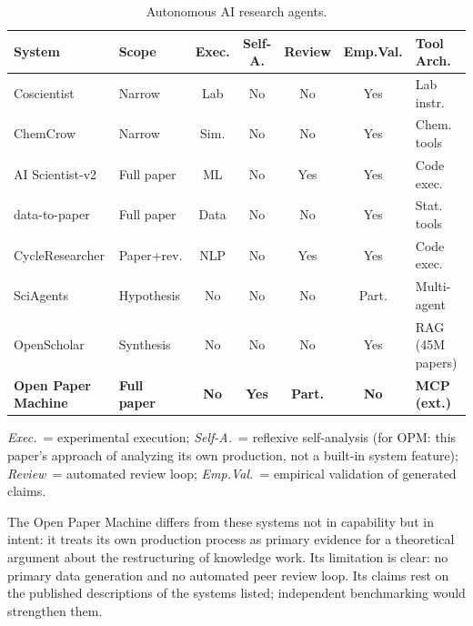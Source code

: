 \documentclass{article}
\begin{document}
\begin{table}[ht]
\centering
\small
\caption{Autonomous AI research agents.}
\label{tab:systems}
\begin{tabularx}{\textwidth}{@{} >{\raggedright\arraybackslash}X l c c c c >{\raggedright\arraybackslash}p{2.2cm} @{}}
\toprule
\textbf{System} & \textbf{Scope} & \textbf{Exec.} & \textbf{Self-A.} & \textbf{Review} & \textbf{Emp.Val.} & \textbf{Tool Arch.} \\
\midrule
Coscientist \citep{boiko2023autonomous} & Narrow & Lab & No & No & Yes & Lab instr. \\
ChemCrow \citep{bran2024chemistry} & Narrow & Sim. & No & No & Yes & Chem. tools \\
AI Scientist-v2 \citep{yamada2025scientist} & Full paper & ML & No & Yes & Yes & Code exec. \\
data-to-paper \citep{ifargan2024autonomous} & Full paper & Data & No & No & Yes & Stat. tools \\
CycleResearcher \citep{weng2024cycleresearcher} & Paper+rev. & NLP & No & Yes & Yes & Code exec. \\
SciAgents \citep{ghafarollahi2024sciagents} & Hypothesis & No & No & No & Part. & Multi-agent \\
OpenScholar \citep{asai2024openscholar} & Synthesis & No & No & No & Yes & RAG (45M papers) \\
\textbf{Open Paper Machine} & \textbf{Full paper} & \textbf{No} & \textbf{Yes} & \textbf{Part.} & \textbf{No} & \textbf{MCP (ext.)} \\
\bottomrule
\end{tabularx}

\vspace{0.5em}
\footnotesize\noindent\textit{Exec.}~= experimental execution; \textit{Self-A.}~= reflexive self-analysis (for OPM: this paper's approach of analyzing its own production, not a built-in system feature); \textit{Review}~= automated review loop; \textit{Emp.Val.}~= empirical validation of generated claims.
\end{table}

The Open Paper Machine differs from these systems not in capability but in intent: it treats its own production process as primary evidence for a theoretical argument about the restructuring of knowledge work. Its limitation is clear: no primary data generation and no automated peer review loop. Its claims rest on the published descriptions of the systems listed; independent benchmarking would strengthen them.
\end{document}
